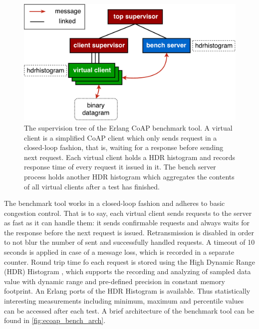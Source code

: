 \begin{figure}[!htbp]
\centering
\includegraphics[scale = 0.55]{ecoap_bench_arch}
\caption[The supervision tree of the Erlang CoAP benchmark tool]{The supervision tree of the Erlang CoAP benchmark tool. A virtual client is a simplified CoAP client which only sends request in a closed-loop fashion, that is, waiting for a response before sending next request. Each virtual client holds a HDR histogram and records response time of every request it issued in it. The bench server process holds another HDR histogram which aggregates the contents of all virtual clients after a test has finished.}
\label{fig:ecoap_bench_arch}
\end{figure}

The benchmark tool works in a closed-loop fashion and adheres to basic congestion control. That is to say, each virtual client sends requests to the server as fast as it can handle them: it sends confirmable requests and always waits for the response before the next request is issued. Retransmission is disabled in order to not blur the number of sent and successfully handled requests. A timeout of 10 seconds is applied in case of a message loss, which is recorded in a separate counter. Round trip time fo each request is stored using the High Dynamic Range (HDR) Histogram \autocite{hdr_erl}, which supports the recording and analyzing of sampled data value with dynamic range and pre-defined precision in constant memory footprint. An Erlang ports of the HDR Histogram is available. Thus statistically interesting measurements including minimum, maximum and percentile values can be accessed after each test. A brief architecture of the benchmark tool can be found in \autoref{fig:ecoap_bench_arch}.


